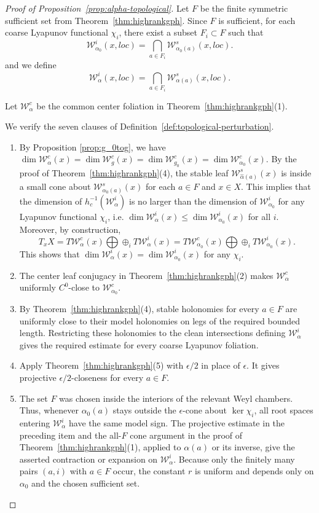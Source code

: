 \documentclass[11pt]{amsart}
\numberwithin{equation}{section}
\newcommand{\W}{\mathcal{W}}
\theoremstyle{plain}
\begin{document}
\begin{proof}[Proof of Proposition~\ref{prop:alpha-topological}]
Let $F$ be the finite symmetric sufficient set from
Theorem~\ref{thm:highrankgph}. Since $F$ is sufficient, for each coarse Lyapunov functional
$\chi_i$, there exist a subset $F_i\subset F$ such that
\[
\mathcal W^i_{\alpha_0}(x,loc)
=
  \bigcap_{a\in F_i}\mathcal W^s_{\alpha_0(a)}(x,loc).
\]
and we define
\[
\mathcal W^i_\alpha(x,loc)
=
  \bigcap_{a\in F_i}\mathcal W^s_{\alpha(a)}(x,loc).
\]


 Let
$\mathcal W^c_\alpha$ be the common center foliation in
Theorem~\ref{thm:highrankgph}(1).

We verify the seven clauses of
Definition~\ref{def:topological-perturbation}.

\begin{enumerate}
\item By Proposition \ref{prop:g_0tog}, we have $\dim \W^c_\alpha(x)=\dim \W^c_g(x)=\dim \W^c_{g_0}(x)=\dim \W^c_{\alpha_0}(x)$. By
the proof of Theorem~\ref{thm:highrankgph}(4), the stable leaf $\W^s_{\hat \alpha(a)}(x)$ is inside a small cone about $\W^s_{\alpha_0(a)}(x)$ for each $a\in F$ and $x\in X$. This implies that the dimension of $h_c^{-1}(\W^i_{\alpha})$ is no larger than  the dimension of $\W^i_{\alpha_0}$ for any Lyapunov functional $\chi_i$, i.e. $\dim \W^i_\alpha(x)\le \dim \W^i_{\alpha_0}(x)$ for all $i$. Moreover, by construction, $$T_xX=T\W^c_\alpha(x)\bigoplus\oplus_iT\W^i_\alpha(x)=T\W^c_{\alpha_0}(x)\bigoplus\oplus_iT\W^i_{\alpha_0}(x).$$ This shows that $\dim \W^i_\alpha(x)=\dim \W^i_{\alpha_0}(x)$  for any $\chi_i$. 

\item The center leaf conjugacy in
Theorem~\ref{thm:highrankgph}(2) makes
$\mathcal W^c_\alpha$ uniformly $C^0$-close to
$\mathcal W^c_{\alpha_0}$.

\item By Theorem~\ref{thm:highrankgph}(4), stable holonomies for every
$a\in F$ are uniformly close to their model holonomies on legs of the
required bounded length.  Restricting these holonomies to the clean
intersections defining $\mathcal W^i_\alpha$ gives the required estimate for every coarse
Lyapunov foliation. 

\item Apply Theorem~\ref{thm:highrankgph}(5) with $\epsilon/2$ in
place of $\epsilon$.  It gives projective $\epsilon/2$-closeness for
every $a\in F$.

\item The set $F$ was chosen inside the interiors of the
relevant Weyl chambers.  Thus, whenever $\alpha_0(a)$ stays outside
the $\epsilon$-cone about $\ker\chi_i$, all root spaces entering
$\mathcal W^i_\alpha$ have the same model sign.  The projective
estimate in the preceding item and the all-$F$ cone argument
in the proof of Theorem~\ref{thm:highrankgph}(1), applied to
$\alpha(a)$ or its inverse, give the asserted contraction or expansion
on $\mathcal W^i_\alpha$.
Because only the finitely many pairs $(a,i)$ with
$a\in F$ occur, the constant $r$ is uniform and depends only
on $\alpha_0$ and the chosen sufficient set.


\end{enumerate}
\end{proof}
\end{document}

